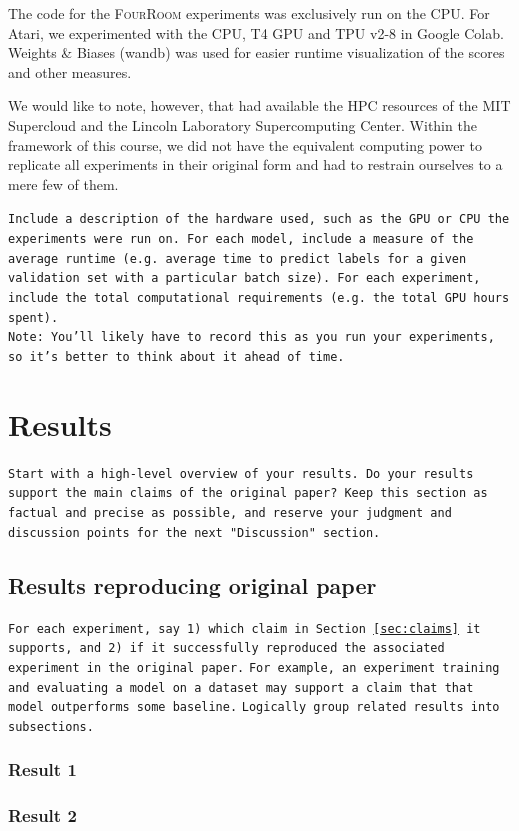 \documentclass[10pt]{article} %
\begin{document}
\noindent The code for the \textsc{FourRoom} experiments was exclusively run on the CPU. For Atari, we experimented with the CPU, T4 GPU and TPU v2-8 in Google Colab. Weights \& Biases (wandb) was used for easier runtime visualization of the scores and other measures.

\noindent We would like to note, however, that \cite{rle-paper} had available the HPC resources of the MIT Supercloud and the Lincoln Laboratory Supercomputing Center. Within the framework of this course, we did not have the equivalent computing power to replicate all experiments in their original form and had to restrain ourselves to a mere few of them.

\texttt{Include a description of the hardware used, such as the GPU or CPU the experiments were run on. 
For each model, include a measure of the average runtime (e.g. average time to predict labels for a given validation set with a particular batch size).
For each experiment, include the total computational requirements (e.g. the total GPU hours spent).}\\
\texttt{Note: You'll likely have to record this as you run your experiments, so it's better to think about it ahead of time.}

\hypertarget{sec4}{\section{Results}}
\texttt{Start with a high-level overview of your results. Do your results support the main claims of the original paper? Keep this section as factual and precise as possible, and reserve your judgment and discussion points for the next "Discussion" section.}


\subsection{Results reproducing original paper}
\texttt{For each experiment, say 1) which claim in Section~\ref{sec:claims} it supports, and 2) if it successfully reproduced the associated experiment in the original paper.}
\texttt{For example, an experiment training and evaluating a model on a dataset may support a claim that that model outperforms some baseline.}
\texttt{Logically group related results into subsections.}

\subsubsection{Result 1}
\subsubsection{Result 2}
\end{document}
